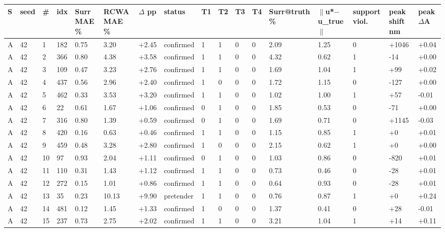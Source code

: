 \documentclass[11pt,a4paper]{article}
\newcounter{none}   %
\begin{document}
\begingroup
\setlength{\tabcolsep}{2pt}\tiny
{}
\label{tab:7}
{\def\LTcaptype{none} %
\begin{longtable}[]{@{}lllllllllllllllll@{}}
\toprule\noalign{}
S & seed & \# & idx & Surr MAE \% & RCWA MAE \% & \ensuremath{\Delta} pp & status & T1 & T2 & T3 & T4 & Surr@truth \% & \ensuremath{\|}u*\ensuremath{-}u\_true\ensuremath{\|} & support viol. & peak shift nm & peak \ensuremath{\Delta}A \\
\midrule\noalign{}
\endhead
\bottomrule\noalign{}
\endlastfoot
A & 42 & 1 & 182 & 0.75 & 3.20 & +2.45 & confirmed & 1 & 1 & 0 & 0 & 2.09 & 1.25 & 0 & +1046 & +0.04 \\
A & 42 & 2 & 366 & 0.80 & 4.38 & +3.58 & confirmed & 1 & 1 & 0 & 0 & 4.32 & 0.62 & 1 & -14 & +0.00 \\
A & 42 & 3 & 109 & 0.47 & 3.23 & +2.76 & confirmed & 1 & 1 & 0 & 0 & 1.69 & 1.04 & 1 & +99 & +0.02 \\
A & 42 & 4 & 437 & 0.56 & 2.96 & +2.40 & confirmed & 1 & 0 & 0 & 0 & 1.72 & 1.15 & 0 & -127 & +0.00 \\
A & 42 & 5 & 462 & 0.33 & 3.53 & +3.20 & confirmed & 1 & 1 & 0 & 0 & 1.02 & 1.00 & 1 & +57 & -0.01 \\
A & 42 & 6 & 22 & 0.61 & 1.67 & +1.06 & confirmed & 0 & 1 & 0 & 0 & 1.85 & 0.53 & 0 & -71 & +0.00 \\
A & 42 & 7 & 316 & 0.80 & 1.39 & +0.59 & confirmed & 0 & 1 & 0 & 0 & 1.69 & 0.71 & 0 & +1145 & -0.03 \\
A & 42 & 8 & 420 & 0.16 & 0.63 & +0.46 & confirmed & 1 & 1 & 0 & 0 & 1.15 & 0.85 & 1 & +0 & +0.01 \\
A & 42 & 9 & 459 & 0.48 & 3.28 & +2.80 & confirmed & 1 & 0 & 0 & 0 & 2.15 & 0.62 & 1 & +0 & +0.00 \\
A & 42 & 10 & 97 & 0.93 & 2.04 & +1.11 & confirmed & 0 & 1 & 0 & 0 & 1.03 & 0.86 & 0 & -820 & +0.01 \\
A & 42 & 11 & 110 & 0.31 & 1.43 & +1.12 & confirmed & 1 & 1 & 0 & 0 & 0.73 & 0.46 & 0 & -28 & +0.01 \\
A & 42 & 12 & 272 & 0.15 & 1.01 & +0.86 & confirmed & 1 & 1 & 0 & 0 & 0.64 & 0.93 & 0 & -28 & +0.01 \\
A & 42 & 13 & 35 & 0.23 & 10.13 & +9.90 & pretender & 1 & 1 & 0 & 0 & 0.76 & 0.87 & 1 & +0 & +0.24 \\
A & 42 & 14 & 481 & 0.12 & 1.45 & +1.33 & confirmed & 1 & 0 & 0 & 0 & 1.37 & 0.41 & 0 & +28 & -0.01 \\
A & 42 & 15 & 237 & 0.73 & 2.75 & +2.02 & confirmed & 1 & 1 & 0 & 0 & 3.21 & 1.04 & 1 & +14 & +0.11 \\

\end{longtable}}
\end{document}
